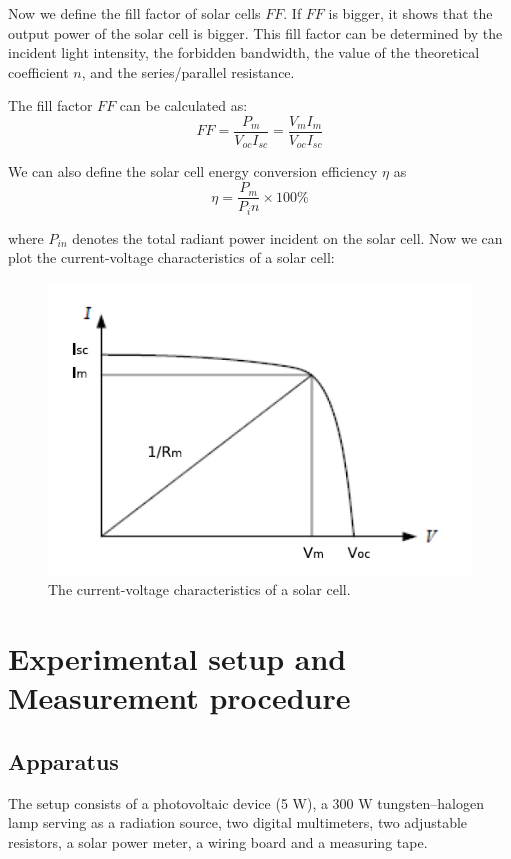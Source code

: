 \documentclass[12pt, a4paper]{article}
\begin{document}
Now we define the fill factor of solar cells $FF$. If $FF$ is bigger, it shows that the output power 
of the solar cell is bigger. This fill factor can be determined by the incident light intensity, the 
forbidden bandwidth, the value of the theoretical coefficient $n$, and the series/parallel resistance.

The fill factor $FF$ can be calculated as:
$$
FF = \frac{P_m}{V_{oc}I_{sc}} = \frac{V_m I_m}{V_{oc}I_{sc}}
$$

We can also define the solar cell energy conversion efficiency $\eta$ as
$$
\eta = \frac{P_m}{P_in} \times 100\%
$$

where $P_{in}$ denotes the total radiant power incident on the solar cell. Now we can plot the 
current-voltage characteristics of a solar cell:

\begin{figure}[H]
	\centering
	\includegraphics[scale = 0.6]{fig2.png}
	\caption{The current-voltage characteristics of a solar cell.}
\end{figure}

\section{Experimental setup and Measurement procedure}
\subsection{Apparatus}
The setup consists of a photovoltaic device (5 W), a 300 W tungsten–halogen lamp
serving as a radiation source, two digital multimeters, two adjustable resistors, a solar
power meter, a wiring board and a measuring tape.
\end{document}
